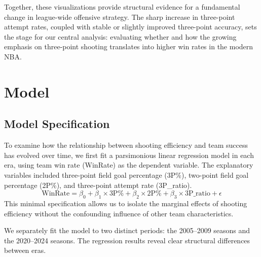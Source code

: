 \documentclass[11pt, a4paper]{article} %
\begin{document}
Together, these visualizations provide structural evidence for a fundamental change in league-wide offensive strategy. 
The sharp increase in three-point attempt rates, coupled with stable or slightly improved three-point accuracy, sets the stage for our 
central analysis: evaluating whether and how the growing emphasis on three-point shooting translates into higher win rates in the modern NBA.



\section{Model}
\subsection{Model Specification}
To examine how the relationship between shooting efficiency and team success has evolved over time, we first fit a parsimonious linear 
regression model in each era, using team win rate (WinRate) as the dependent variable. The explanatory variables included three-point 
field goal percentage (3P\%), two-point field goal percentage (2P\%), and three-point attempt rate (3P\_ratio). 
\[
\text{WinRate} = \beta_0 + \beta_1 \times \text{3P\%} + \beta_2 \times \text{2P\%} + \beta_3 \times \text{3P\_ratio} + \epsilon
\]
This minimal specification 
allows us to isolate the marginal effects of shooting efficiency without the confounding influence of other team characteristics.

We separately fit the model to two distinct periods: the 2005--2009 seasons and the 2020--2024 seasons. The regression results reveal 
clear structural differences between eras.
\end{document}
